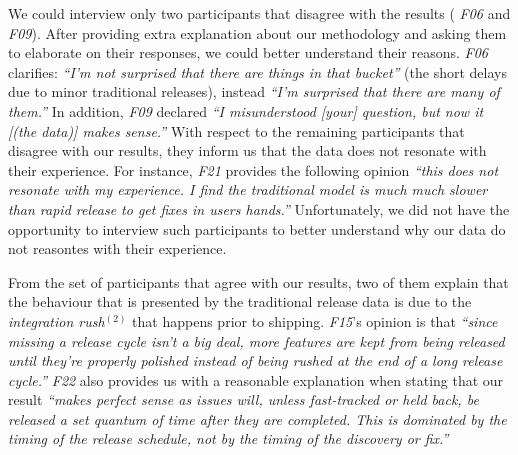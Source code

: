 We could interview only two participants that disagree with the results ({\em
F06} and {\em F09}). After providing extra explanation about our methodology and
asking them to elaborate on their responses, we could better understand their
reasons.  {\em F06} clarifies: {\em ``I'm not surprised that there are things in
that bucket''} (the short delays due to minor traditional releases), instead
{\em ``I'm surprised that there are many of them.''} In addition, {\em F09}
declared {\em ``I misunderstood [your] question, but now it [(the data)] makes
sense.''} With respect to the remaining participants that disagree with our
results, they inform us that the data does not resonate with their experience.
For instance, {\em F21} provides the following opinion {\em ``this does not
resonate with my experience. I find the traditional model is much much slower
than rapid release to get fixes in users hands.''} Unfortunately, we did not
have the opportunity to interview such participants to better understand why our
data do not reasontes with their experience.

From the set of participants that agree with our results, two of them explain
that the behaviour that is presented by the traditional release data is due to
the {\em integration rush}$^{(2)}$ that happens prior to shipping. {\em F15}'s
opinion is that {\em ``since missing a release cycle isn't a big deal, more
features are kept from being released until they're properly polished instead of
being rushed at the end of a long release cycle.''} {\em F22} also provides us
with a reasonable explanation when stating that our result {\em ``makes perfect
	sense as issues will, unless fast-tracked or held back, be released a
	set quantum of time after they are completed. This is dominated by the
	timing of the release schedule, not by the timing of the discovery or
fix.''}\\


